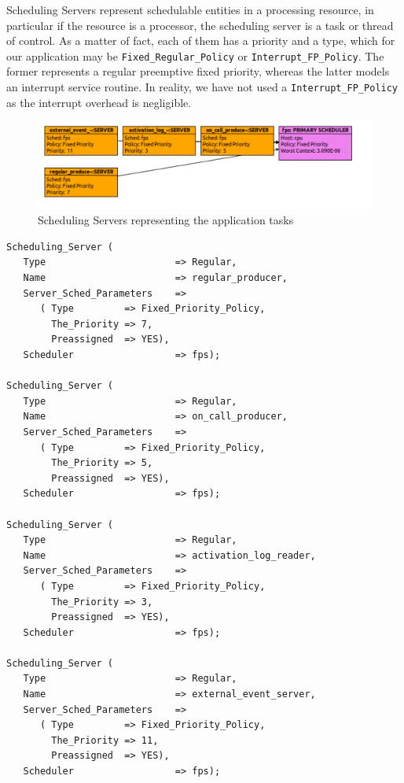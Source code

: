 \documentclass{article}
\begin{document}
Scheduling Servers represent schedulable entities in a processing resource, in particular if the resource is a processor, the scheduling server is a task or thread of control. As a matter of fact, each of them has a priority and a type, which for our application may be \texttt{Fixed\_Regular\_Policy} or \texttt{Interrupt\_FP\_Policy}. The former represents a regular preemptive fixed priority, whereas the latter models an interrupt service routine. In reality, we have not used a \texttt{Interrupt\_FP\_Policy} as the interrupt overhead is negligible.

\begin{figure}[!htbp]
\centering
\includegraphics[width=5in]{images/scheduling-servers}
\caption{Scheduling Servers representing the application tasks}
\label{scheduling-servers}
\end{figure}

\begin{lstlisting}
Scheduling_Server (
   Type                       => Regular,
   Name                       => regular_producer,
   Server_Sched_Parameters    =>
      ( Type         => Fixed_Priority_Policy,
        The_Priority => 7,
        Preassigned  => YES),
   Scheduler                  => fps);

Scheduling_Server (
   Type                       => Regular,
   Name                       => on_call_producer,
   Server_Sched_Parameters    =>
      ( Type         => Fixed_Priority_Policy,
        The_Priority => 5,
        Preassigned  => YES),
   Scheduler                  => fps);

Scheduling_Server (
   Type                       => Regular,
   Name                       => activation_log_reader,
   Server_Sched_Parameters    =>
      ( Type         => Fixed_Priority_Policy,
        The_Priority => 3,
        Preassigned  => YES),
   Scheduler                  => fps);

Scheduling_Server (
   Type                       => Regular,
   Name                       => external_event_server,
   Server_Sched_Parameters    =>
      ( Type         => Fixed_Priority_Policy,
        The_Priority => 11,
        Preassigned  => YES),
   Scheduler                  => fps);
\end{lstlisting}
\end{document}
